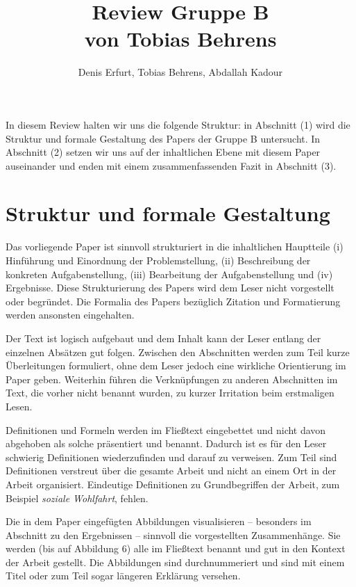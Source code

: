 \documentclass[sigconf]{acmart}
\begin{document}
\title{Review Gruppe B \\ von Tobias Behrens}
\author{Denis Erfurt, Tobias Behrens, Abdallah Kadour}

\maketitle

In diesem Review halten wir uns die folgende Struktur: in Abschnitt (1) wird die Struktur und formale Gestaltung des Papers der Gruppe B untersucht. In Abschnitt  (2) setzen wir uns auf der inhaltlichen Ebene mit diesem Paper auseinander und enden mit einem zusammenfassenden Fazit in Abschnitt (3).

\section{Struktur und formale Gestaltung}
\label{struktur}
Das vorliegende Paper ist sinnvoll strukturiert in die inhaltlichen Hauptteile (i) Hinführung und Einordnung der Problemstellung, (ii) Beschreibung der konkreten Aufgabenstellung, (iii) Bearbeitung der Aufgabenstellung und (iv) Ergebnisse. Diese Strukturierung des Papers wird dem Leser nicht vorgestellt oder begründet. Die Formalia des Papers bezüglich Zitation und Formatierung werden ansonsten eingehalten.

Der Text ist logisch aufgebaut und dem Inhalt kann der Leser entlang der einzelnen Absätzen gut folgen. Zwischen den Abschnitten werden zum Teil kurze Überleitungen formuliert, ohne dem Leser jedoch eine wirkliche Orientierung im Paper geben. Weiterhin führen die Verknüpfungen zu anderen Abschnitten im Text, die vorher nicht benannt wurden, zu kurzer Irritation beim erstmaligen Lesen.

Definitionen und Formeln werden im Fließtext eingebettet und nicht davon abgehoben als solche präsentiert und benannt. Dadurch ist es für den Leser schwierig Definitionen wiederzufinden und darauf zu verweisen. Zum Teil sind Definitionen verstreut über die gesamte Arbeit und nicht an einem Ort in der Arbeit organisiert. Eindeutige Definitionen zu Grundbegriffen der Arbeit, zum Beispiel \textit{soziale Wohlfahrt}, fehlen.

Die in dem Paper eingefügten Abbildungen visualisieren -- besonders im Abschnitt zu den Ergebnissen -- sinnvoll die vorgestellten Zusammenhänge. Sie werden (bis auf Abbildung 6) alle im Fließtext benannt und gut in den Kontext der Arbeit gestellt. Die Abbildungen sind durchnummeriert und sind mit einem Titel oder zum Teil sogar längeren Erklärung versehen.
\end{document}
